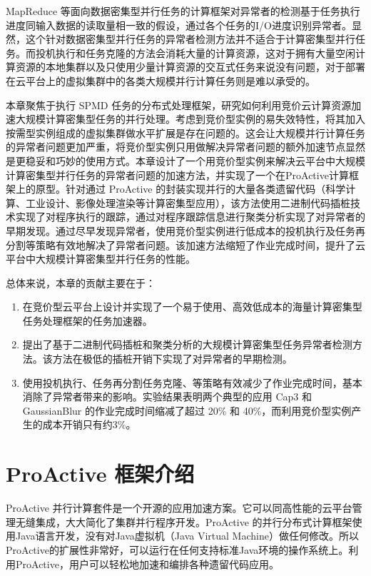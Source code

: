 MapReduce 等面向数据密集型并行任务的计算框架对异常者的检测基于任务执行进度同输入数据的读取量相一致的假设，通过各个任务的I/O进度识别异常者。显然，这个针对数据密集型并行任务的异常者检测方法并不适合于计算密集型并行任务。而投机执行和任务克隆的方法会消耗大量的计算资源，这对于拥有大量空闲计算资源的本地集群以及只使用少量计算资源的交互式任务来说没有问题，对于部署在云平台上的虚拟集群中的各类大规模并行计算任务则是难以承受的。

本章聚焦于执行 SPMD 任务的分布式处理框架，研究如何利用竞价云计算资源加速大规模计算密集型任务的并行处理。考虑到竞价型实例的易失效特性，将其加入按需型实例组成的虚拟集群做水平扩展是存在问题的。这会让大规模并行计算任务的异常者问题更加严重，将竞价型实例只用做解决异常者问题的额外加速节点显然是更稳妥和巧妙的使用方式。本章设计了一个用竞价型实例来解决云平台中大规模计算密集型并行任务的异常者问题的加速方法，并实现了一个在ProActive计算框架上的原型。针对通过 ProActive 的封装实现并行的大量各类遗留代码（科学计算、工业设计、影像处理渲染等计算密集型应用），该方法使用二进制代码插桩技术实现了对程序执行的跟踪，通过对程序跟踪信息进行聚类分析实现了对异常者的早期发现。通过尽早发现异常者，使用竞价型实例进行低成本的投机执行及任务再分割等策略有效地解决了异常者问题。该加速方法缩短了作业完成时间，提升了云平台中大规模计算密集型并行任务的性能。

总体来说，本章的贡献主要在于：
\begin{enumerate}
\item 在竞价型云平台上设计并实现了一个易于使用、高效低成本的海量计算密集型任务处理框架的任务加速器。
\item 提出了基于二进制代码插桩和聚类分析的大规模计算密集型任务异常者检测方法。该方法在极低的插桩开销下实现了对异常者的早期检测。
\item 使用投机执行、任务再分割任务克隆、等策略有效减少了作业完成时间，基本消除了异常者带来的影响。实验结果表明两个典型的应用 Cap3 和 GaussianBlur 的作业完成时间缩减了超过 20\% 和 40\%，而利用竞价型实例产生的成本开销只有约3\%。
\end{enumerate}

\section{ProActive 框架介绍}
ProActive \cite{ProActive} 并行计算套件是一个开源的应用加速方案。它可以同高性能的云平台管理无缝集成，大大简化了集群并行程序开发。ProActive 的并行分布式计算框架使用Java语言开发，没有对Java虚拟机（Java Virtual Machine）做任何修改。所以 ProActive的扩展性非常好，可以运行在任何支持标准Java环境的操作系统上。利用ProActive，用户可以轻松地加速和编排各种遗留代码应用。

